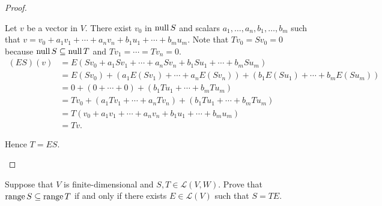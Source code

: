 \begin{proof}
\begin{enumerate}[label={\textbf{Step \arabic*.}},itemindent={1cm}]
              Let $v$ be a vector in $V$. There exist $v_{0}$ in $\text{null}\,{S}$ and scalars $a_{1}, \ldots, a_{n}, b_{1}, \ldots, b_{m}$ such that $v = v_{0} + a_{1}v_{1} + \cdots + a_{n}v_{n} + b_{1}u_{1} + \cdots + b_{m}u_{m}$. Note that $Tv_{0} = Sv_{0} = 0$ because $\text{null}\,{S}\subseteq \text{null}\,{T}$ and $Tv_{1} = \cdots = Tv_{n} = 0$.
              \begin{align*}
                  (ES)(v) & = E(Sv_{0} + a_{1}Sv_{1} + \cdots + a_{n}Sv_{n} + b_{1}Su_{1} + \cdots + b_{m}Su_{m})                 \\
                          & = E(Sv_{0}) + (a_{1}E(Sv_{1}) + \cdots + a_{n}E(Sv_{n})) + (b_{1}E(Su_{1}) + \cdots + b_{m}E(Su_{m})) \\
                          & = 0 + (0 + \cdots + 0) + (b_{1}Tu_{1} + \cdots + b_{m}Tu_{m})                                         \\
                          & = Tv_{0} + (a_{1}Tv_{1} + \cdots + a_{n}Tv_{n}) + (b_{1}Tu_{1} + \cdots + b_{m}Tu_{m})                \\
                          & = T(v_{0} + a_{1}v_{1} + \cdots + a_{n}v_{n} + b_{1}u_{1} + \cdots + b_{m}u_{m})                      \\
                          & = Tv.
              \end{align*}

              Hence $T = ES$.\qedhere
    \end{enumerate}
\end{proof}
\newpage

\begin{exercise}
    Suppose that $V$ is finite-dimensional and $S, T \in \mathcal{L}(V, W)$. Prove that $\text{range}\,{S} \subseteq \text{range}\,{T}$ if and only if there exists $E \in \mathcal{L}(V)$ such that $S = TE$.
\end{exercise}


